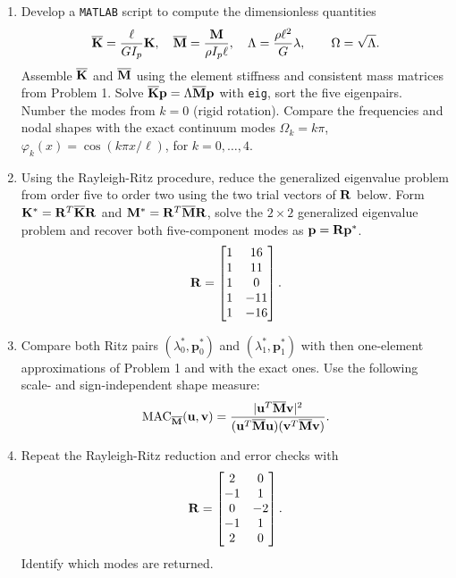 \documentclass[12pt]{article}
\begin{document}
\begin{enumerate}
    \item Develop a \texttt{MATLAB} script to compute the dimensionless quantities
          \[
              \overline{\mathbf K}=\frac{\ell}{GI_p}\mathbf{K},\quad
              \overline{\mathbf M}=\frac{\mathbf{M}}{\rho I_p\ell},\quad
              \Lambda=\frac{\rho\ell^2}{G}\lambda,\qquad
              \Omega=\sqrt{\Lambda}.
          \]
          Assemble $\overline{\mathbf K}$ and $\overline{\mathbf M}$ using the element stiffness and consistent mass
          matrices from Problem 1. Solve $\overline{\mathbf K}\mathbf{p}=\Lambda\overline{\mathbf M}\mathbf{p}$ with
          \texttt{eig}, sort the five eigenpairs. Number the modes from $k=0$ (rigid rotation). Compare the frequencies and nodal shapes with the exact continuum modes
          $\Omega_k=k\pi$, $\varphi_k(x)=\cos(k\pi x/\ell)$, for $k=0,\ldots,4$.
    \item Using the Rayleigh-Ritz procedure, reduce the generalized eigenvalue problem from order five to order two using the two trial vectors of $\mathbf{R}$ below.
          Form $\mathbf{K}^*=\mathbf{R}^{T}\overline{\mathbf K}\mathbf{R} $ and $\mathbf{M}^*=\mathbf{R}^{T}\overline{\mathbf M}\mathbf{R}$, solve the $2\times2$ generalized eigenvalue problem and recover both five-component modes as ${\mathbf{p}}=\mathbf{R}\mathbf{p}^*$.
          \[
              \mathbf{R}=\begin{bmatrix}1&16\\1&11\\1&0\\1&-11\\1&-16\end{bmatrix}.
          \]
    \item Compare both Ritz pairs $(\lambda_0^*,\mathbf p_0^*)$ and $(\lambda_1^*,\mathbf p_1^*)$ with then one-element approximations of Problem 1 and with the exact ones. Use the following scale- and sign-independent shape measure:
          \[
              \operatorname{MAC}_{\overline{\mathbf M}}(\mathbf{u},\mathbf{v})=
              \frac{|\mathbf{u}^{T}\overline{\mathbf M}\mathbf{v}|^2}{(\mathbf{u}^{T}\overline{\mathbf M}\mathbf{u})(\mathbf{v}^{T}\overline{\mathbf M}\mathbf{v})}.
          \]
    \item Repeat the Rayleigh-Ritz reduction and error checks with
          \[
              \mathbf{R}=\begin{bmatrix}2&0\\-1&1\\0&-2\\-1&1\\2&0\end{bmatrix}.
          \]
          Identify which modes are returned.
\end{enumerate}
\end{document}
